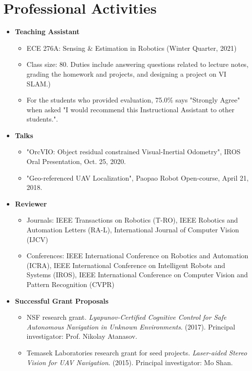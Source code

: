 \documentclass[letterpaper,11pt]{article}
\newcommand{\resumeItem}[1]{
  \item\small{
    {#1 \vspace{-2pt}}
  }
}
\newcommand{\resumeSubHeadingListStart}{\begin{itemize}[leftmargin=0.15in, label={}]}
\newcommand{\resumeSubHeadingListEnd}{\end{itemize}}
\newcommand{\resumeItemListStart}{\begin{itemize}}
\newcommand{\resumeItemListEnd}{\end{itemize}\vspace{-5pt}}
\begin{document}
\section{Professional Activities}
  \resumeSubHeadingListStart
  
  \resumeItem{\textbf{Teaching Assistant}}
      \resumeItemListStart
        \resumeItem{ECE 276A: Sensing $\&$ Estimation in Robotics (Winter Quarter, 2021)}
        \resumeItem{Class size: 80. Duties include answering questions related to lecture notes, grading the homework and projects, and designing a project on VI SLAM.)}
        \resumeItem{For the students who provided evaluation, 75.0\% says "Strongly Agree" when asked "I would recommend this Instructional Assistant to other students.".}
    \resumeItemListEnd
  
  \resumeItem{\textbf{Talks}}
      \resumeItemListStart
        \resumeItem{"OrcVIO: Object residual constrained Visual-Inertial Odometry", IROS Oral Presentation, Oct. 25, 2020.}
        \resumeItem{"Geo-referenced UAV Localization", Paopao Robot Open-course, April 21, 2018.}
    \resumeItemListEnd
  
  \resumeItem{\textbf{Reviewer}}
      \resumeItemListStart
        \resumeItem{Journals: IEEE Transactions on Robotics (T-RO), IEEE Robotics and Automation Letters (RA-L), International Journal of Computer Vision (IJCV)}
        \resumeItem{Conferences: IEEE International Conference on Robotics and Automation (ICRA), IEEE International Conference on Intelligent Robots and Systems (IROS), IEEE International Conference on Computer Vision and Pattern Recognition (CVPR)}
    \resumeItemListEnd
    
  \resumeItem{\textbf{Successful Grant Proposals}}
      \resumeItemListStart
        \resumeItem{NSF research grant. \textit{Lyapunov-Certified Cognitive Control for Safe
Autonomous Navigation in Unknown Environments}. (2017). Principal investigator: Prof. Nikolay Atanasov.}
        \resumeItem{Temasek Laboratories research grant for seed projects. \textit{Laser-aided Stereo Vision for UAV Navigation}. (2015). Principal investigator: Mo Shan.}
    \resumeItemListEnd
    
  \resumeSubHeadingListEnd


\end{document}
